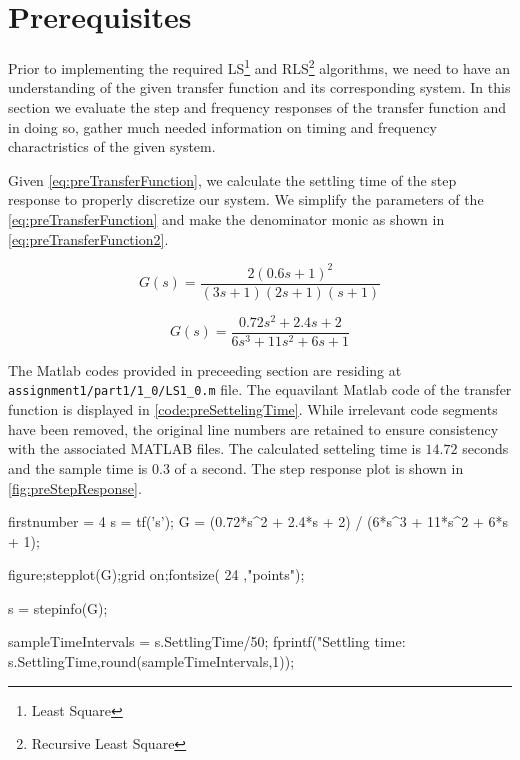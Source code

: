\section{Prerequisites}

Prior to implementing the required LS\footnote{Least Square} and RLS\footnote{Recursive Least Square} algorithms, we need to have an understanding of the given transfer function and its corresponding system. In this section we evaluate the step and frequency responses of the transfer function and in doing so, gather much needed information on timing and frequency charactristics of the given system. 

Given  \autoref{eq:preTransferFunction}, we calculate the settling time of the step response to properly discretize our system. We simplify the parameters of the  \autoref{eq:preTransferFunction} and make the denominator monic as shown in  \autoref{eq:preTransferFunction2}. 

\begin{equation}
	G(s) = \frac{2(0.6s + 1)^2}{(3s + 1)(2s + 1)(s + 1)}
	\label{eq:preTransferFunction}
\end{equation}

\begin{equation}
	G(s) = \frac{0.72s^2 + 2.4s + 2}{6s^3 + 11s^2 + 6s + 1}
	\label{eq:preTransferFunction2}
\end{equation}


The Matlab codes provided in preceeding section are residing at \hspace{-1ex}\lstinline| assignment1/part1/1_0/LS1_0.m| file. The equavilant Matlab code of the transfer function is displayed in  \autoref{code:preSettelingTime}. While irrelevant code segments have been removed, the original line numbers are retained to ensure consistency with the associated MATLAB files. The calculated setteling time is $14.72$ seconds and the sample time is $0.3$ of a second. The step response plot is shown in  \autoref{fig:preStepResponse}.

\begin{code}
	\begin{matlabcode}{firstnumber = 4}
		s = tf('s');
		G = (0.72*s^2 + 2.4*s + 2) / (6*s^3 + 11*s^2 + 6*s + 1);
		
		figure;stepplot(G);grid on;fontsize( 24 ,"points");
		
		s = stepinfo(G);
		
		sampleTimeIntervals = s.SettlingTime/50;
		fprintf("Settling time:%
		s.SettlingTime,round(sampleTimeIntervals,1));
	\end{matlabcode}
	\label{code:preSettelingTime}
\end{code}

